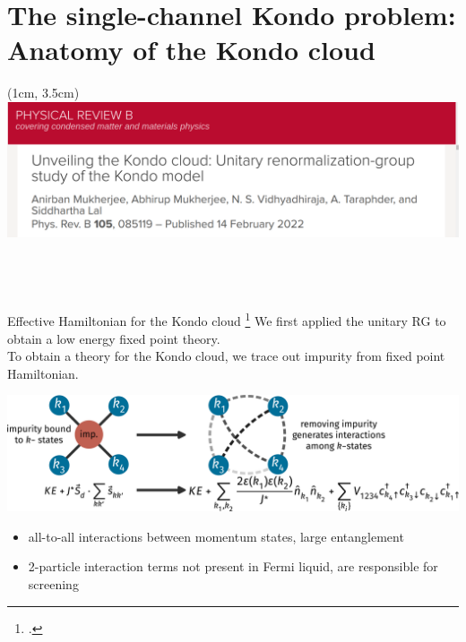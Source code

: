 \documentclass[10pt,aspectratio=169]{beamer}
\begin{document}
\section{The single-channel Kondo problem:\\ Anatomy of the Kondo cloud\vspace*{20pt}}
\begin{textblock*}{\textwidth}(1cm, 3.5cm)
\includegraphics[width=\textwidth]{kondocloud_prb.pdf}\\
\end{textblock*}
\subsection{~}

\begin{frame}{Effective Hamiltonian for the Kondo cloud}
\footcite{anirban_kondo,anirbanurg1,anirbanurg2}
We first applied the \alert{unitary RG} to obtain a low energy fixed point theory.\\[10pt]
To obtain a theory for the Kondo cloud, we \alert{trace out impurity} from fixed point Hamiltonian.
\vspace*{\fill}

\includegraphics[width=\textwidth]{KondoCloud.pdf}

\vspace*{\fill}
\begin{itemize}
	\item all-to-all interactions between momentum states, \alert{large entanglement}
	\item 2-particle interaction terms \alert{not} present in Fermi liquid, are \alert{responsible for screening}
\end{itemize}

\end{frame}
\end{document}
